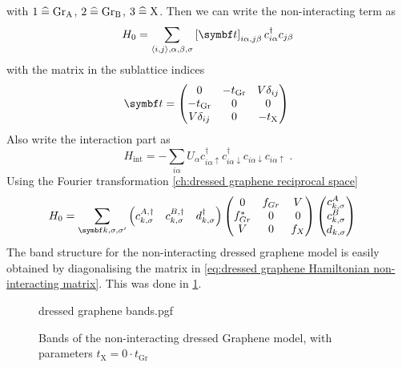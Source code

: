 \documentclass[../notes.tex]{subfiles}
\begin{document}
with \(1 \mathrel{\widehat{=}} \mathrm{Gr}_{\mathrm{A}}\), \(2 \mathrel{\widehat{=}} \mathrm{Gr}_{\mathrm{B}}\), \(3 \mathrel{\widehat{=}} \mathrm{X}\).
Then we can write the non-interacting term as
\begin{equation}
	H_0 = \sum_{\langle i, j \rangle, \alpha, \beta, \sigma} \left[\mat{t} \right]_{i\alpha,j\beta} c_{i\alpha}^{\dagger} c_{j\beta}
\end{equation}
with the matrix in the sublattice indices
\begin{equation}
	\mat{t} = \begin{pmatrix}
		0 & -t_{\mathrm{Gr}} & V \delta_{ij} \\
		-t_{\mathrm{Gr}} & 0 & 0 \\
		V \delta_{ij} & 0 & -t_{\mathrm{X}} \\
	\end{pmatrix}\;
\end{equation}
Also write the interaction part as
\begin{equation}
	H_{\mathrm{int}} = - \sum_{i \alpha} U_{\alpha} c_{i\alpha \uparrow}^{\dagger} c_{i\alpha \downarrow}^{\dagger} c_{i\alpha \downarrow} c_{i\alpha \uparrow}\;.
\end{equation}
Using the Fourier transformation \cref{ch:dressed graphene reciprocal space}
\begin{align}
	H_0 &= \sum_{\vb{k}, \sigma, \sigma^{\prime}} \begin{pmatrix} c_{k, \sigma}^{A, \dagger} & c_{k, \sigma}^{B, \dagger} & d_{k, \sigma}^{\dagger} \end{pmatrix}
	\begin{pmatrix}
		0 & f_{Gr} & V \\
		f_{Gr}^* & 0 & 0 \\
		V & 0 & f_{X}
	\end{pmatrix} \begin{pmatrix} c_{k, \sigma}^{A} \\ c_{k, \sigma}^{B} \\ d_{k, \sigma} \end{pmatrix}
	\label{eq:dressed graphene Hamiltonian non-interacting matrix}
\end{align}
The band structure for the non-interacting dressed graphene model is easily obtained by diagonalising the matrix in \cref{eq:dressed graphene Hamiltonian non-interacting matrix}.
This was done in \cref{fig:dressed graphene model non-interacting bands}.
\begin{figure}[t]
	\centering
	 {dressed graphene bands.pgf}
	\caption{Bands of the non-interacting dressed Graphene model, with parameters \(t_{\mathrm{X}} = 0 \cdot t_{\mathrm{Gr}}\)}
	\label{fig:dressed graphene model non-interacting bands}
\end{figure}
\end{document}
